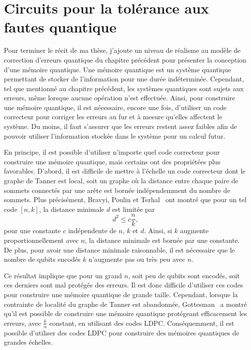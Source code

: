 \begin{comment}
\end{comment}

\chapter{Circuits pour la tolérance aux fautes quantique}

Pour terminer le récit de ma thèse,
j'ajoute un niveau de réalisme au modèle de correction d'erreurs quantique
du chapitre précédent pour présenter la conception d'une mémoire quantique.
Une mémoire quantique est un système quantique permettant de stocker
de l'information pour une durée indéterminée.
Cependant,
tel que mentionné au chapitre précédent,
les systèmes quantiques sont sujets aux erreurs,
même lorsque aucune opération n'est effectuée.
Ainsi,
pour construire une mémoire quantique,
il est nécessaire, encore une fois,
d'utiliser un code correcteur pour corriger les erreurs au fur et à mesure
qu'elles affectent le système.
Du moins,
il faut s'assurer que les erreurs restent assez faibles afin de pouvoir utiliser
l'information stockée dans le système pour un calcul futur.

En principe,
il est possible d'utiliser n'importe quel code correcteur pour construire
une mémoire quantique,
mais certains ont des propriétées plus favorables.
D'abord,
il est difficile de mettre à l'échelle un code correcteur dont le graphe
de Tanner est local, soit un graphe où la distance entre chaque paire de sommets 
connectés par une arête est bornée indépendemment du nombre de sommets.
Plus précisément,
Bravyi, Poulin et Terhal~\cite{bravyi_tradeoffs_2010}
ont montré que pour un tel code $[n, k]$,
la distance minimale $d$ est limitée par
\begin{equation}
	d^2 \leq c \frac{n}{k},
\end{equation}
pour une constante $c$ indépendente de $n$, $k$ et $d$.
Ainsi,
si $k$ augmente proportionnellement avec $n$,
la distance minimale est bornée par une constante.
De plus,
pour avoir une distance minimale raisonnable,
il est nécessaire que le nombre de qubits encodés $k$ 
n'augmente pas ou très peu avec $n$.

Ce résultat implique que pour un grand $n$,
soit peu de qubits sont encodés,
soit ces derniers sont mal protégés des erreurs.
Il est donc difficile d'utiliser ces codes pour construire une mémoire 
quantique de grande taille.
Cependant,
lorsque la contrainte de localité du graphe de Tanner est abandonnée,
Gottesman~\cite{gottesman_fault-tolerant_2013} a montré qu'il est possible 
de construire une mémoire quantique protégeant efficacement les erreurs,
avec $\frac{k}{n}$ constant, en utilisant des codes LDPC.
Conséquemment,
il est possible d'utiliser des codes LDPC pour construire 
des mémoires quantiques de grandes échelles.

